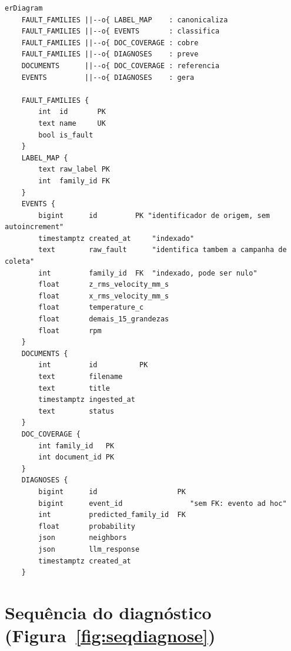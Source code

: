 \begin{lstlisting}[language=mermaid, caption={Modelo entidade-relacionamento}, label={lst:mmer}]
erDiagram
    FAULT_FAMILIES ||--o{ LABEL_MAP    : canonicaliza
    FAULT_FAMILIES ||--o{ EVENTS       : classifica
    FAULT_FAMILIES ||--o{ DOC_COVERAGE : cobre
    FAULT_FAMILIES ||--o{ DIAGNOSES    : preve
    DOCUMENTS      ||--o{ DOC_COVERAGE : referencia
    EVENTS         ||--o{ DIAGNOSES    : gera

    FAULT_FAMILIES {
        int  id       PK
        text name     UK
        bool is_fault
    }
    LABEL_MAP {
        text raw_label PK
        int  family_id FK
    }
    EVENTS {
        bigint      id         PK "identificador de origem, sem autoincrement"
        timestamptz created_at     "indexado"
        text        raw_fault      "identifica tambem a campanha de coleta"
        int         family_id  FK  "indexado, pode ser nulo"
        float       z_rms_velocity_mm_s
        float       x_rms_velocity_mm_s
        float       temperature_c
        float       demais_15_grandezas
        float       rpm
    }
    DOCUMENTS {
        int         id          PK
        text        filename
        text        title
        timestamptz ingested_at
        text        status
    }
    DOC_COVERAGE {
        int family_id   PK
        int document_id PK
    }
    DIAGNOSES {
        bigint      id                   PK
        bigint      event_id                "sem FK: evento ad hoc"
        int         predicted_family_id  FK
        float       probability
        json        neighbors
        json        llm_response
        timestamptz created_at
    }
\end{lstlisting}

\section{Sequência do diagnóstico (Figura~\ref{fig:seqdiagnose})}

